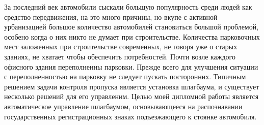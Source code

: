 \label{sec:intro}

За последний век автомобили сыскали большую популярность среди людей как средство передвижения, на это много причины, но вкупе с активной урбанизацией большое количество автомобилей становиться большой проблемой, особено когда о них никто не думает при строительстве. Количества парковочных мест заложенных при строительстве современных, не говоря уже о старых зданиях, не хватает чтобы обеспечить потребностей. Почти возле каждого офисного здания переполненны парковки. Прежде всего для улучшения ситуации с переполненностью на парковку не следует пускать посторонних. Типичным решением задачи контроля пропуска является установка шлагбаума, и существует несколько решений для его управленим. Целью моей дипломной работы является автоматическое управление шлагбаумом, основывающееся на распознавании государственных регистрационных знаках подъезжающего к стоянке автомобиля. 

